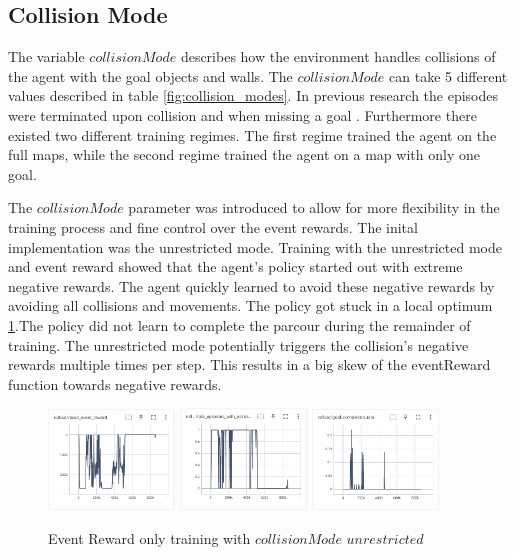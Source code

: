 \subsection{Collision Mode}

The variable $collisionMode$ describes how the environment handles collisions of the agent with the goal objects and walls. The $collisionMode$ can take 5 different values described in table \ref{fig:collision_modes}. In previous research the episodes were terminated upon collision and when missing a goal \textcite{maximilian}. Furthermore there existed two different training regimes. The first regime trained the agent on the full maps, while the second regime trained the agent on a map with only one goal.

The $collisionMode$ parameter was introduced to allow for more flexibility in the training process and fine control over the event rewards. The inital implementation was the unrestricted mode. Training with the unrestricted mode and event reward showed that the agent's policy started out with extreme negative rewards. The agent quickly learned to avoid these negative rewards by avoiding all collisions and movements. The policy got stuck in a local optimum \ref{fig:event_reward_only_collisionModeUnrestricted_event_reward}.The policy did not learn to complete the parcour during the remainder of training. The unrestricted mode potentially triggers the collision's negative rewards multiple times per step. This results in a big skew of the eventReward function towards negative rewards.

\begin{figure}
    \centering
    \includegraphics[width=0.3\textwidth]{Bilder/tensorboard_images/eventRewardOnly_collisionModeUnrestricted_eventReward.png}
    \includegraphics[width=0.3\textwidth]{Bilder/tensorboard_images/eventRewardOnly_collisionModeUnrestricted_collisionRate.png}
    \includegraphics[width=0.3\textwidth]{Bilder/tensorboard_images/eventRewardOnly_collisionModeUnrestricted_goalCompletionRate.png}
    \caption{Event Reward only training with $collisionMode$ $unrestricted$}
    \label{fig:event_reward_only_collisionModeUnrestricted_event_reward}
\end{figure}

